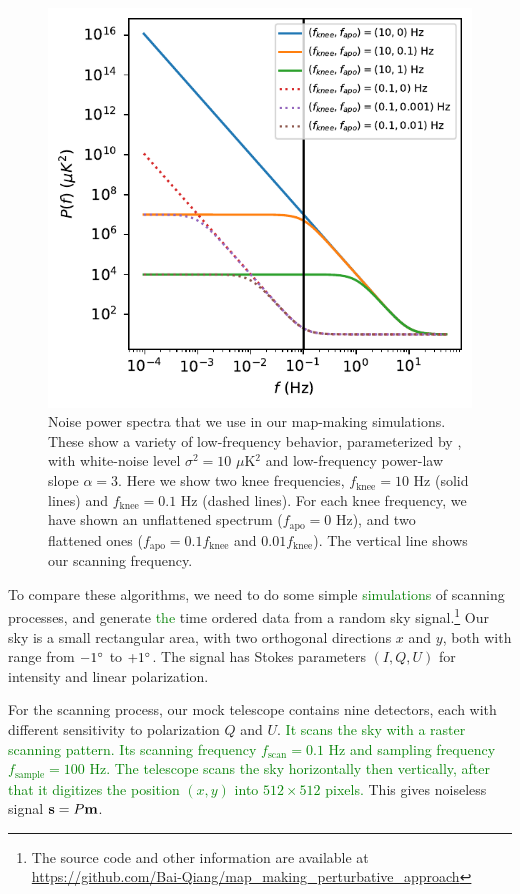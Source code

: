 \documentclass[twocolumn,linenumbers]{aastex631}
\newcommand{\Eq}[1]{\text{Eq.\,\ref{#1}}}
\newcommand{\textgreen}[1]{\textcolor{green}{#1}}
\begin{document}
\begin{figure}[tb!]
\includegraphics[width=\linewidth]{P_f.pdf}
\centering
\caption{Noise power spectra that we use in our map-making simulations.  These show a variety of low-frequency behavior, parameterized by \Eq{noise power spectrum}, with 
    white-noise level $\sigma^2 = 10$ $\mu$K$^2$ and low-frequency power-law slope $\alpha = 3$.
    Here we show two knee frequencies, $f_\text{knee}=10$ Hz (solid lines)  
    and $f_\text{knee}=0.1$ Hz (dashed lines).
    For each knee frequency, we have shown an unflattened spectrum ($f_\text{apo}=0$ Hz), and two flattened ones ($f_\text{apo}=0.1f_\text{knee}$ and
    $0.01f_\text{knee}$).
    The vertical line shows our scanning frequency.
}
\label{power spectrum}
\end{figure}

To compare these algorithms, we need to do some simple \textgreen{simulations} of scanning
processes, and generate \textgreen{the} time ordered data from a random sky signal.\footnote{
The source code and other information are available at \url{https://github.com/Bai-Qiang/map_making_perturbative_approach}
}
Our sky is a small rectangular area, with two orthogonal directions $x$ and
$y$, both with range from $-1\degree$ to $+1\degree$.
The signal has Stokes parameters $(I,Q,U)$ for intensity and linear polarization.

For the scanning process, our mock telescope contains nine detectors,
each with different sensitivity to polarization $Q$ and $U$.
\textgreen{
It scans the sky with a raster scanning pattern.
Its scanning frequency $f_{\text{scan}} = 0.1$ Hz and sampling frequency $f_{\text{sample}} = 100$ Hz.
The telescope scans the sky horizontally then vertically,
after that it digitizes the position $(x, y)$ into $512\times 512$ pixels.
}
This gives noiseless signal $\vb{s} = P\vb{m}$.
\end{document}
